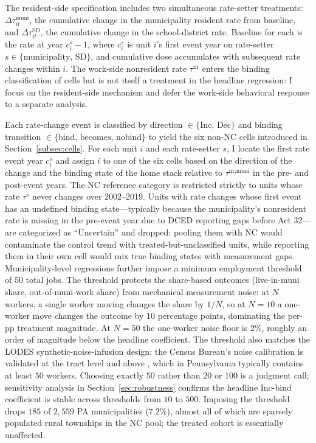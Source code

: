 \documentclass[12pt]{article}
\begin{document}
The resident-side specification includes two simultaneous rate-setter
treatments: $\Delta\tau^{\text{muni}}_{it}$, the cumulative change in
the municipality resident rate from baseline, and $\Delta\tau^{\text{SD}}_{it}$,
the cumulative change in the school-district rate. Baseline for each
is the rate at year $c_i^s - 1$, where $c_i^s$ is unit $i$'s first
event year on rate-setter $s \in \{\text{municipality, SD}\}$, and cumulative dose
accumulates with subsequent rate changes within $i$. The work-side
nonresident rate $\tau^{\text{nr}}$ enters the binding
classification of cells but is not itself a treatment in the headline
regression: I focus on the resident-side mechanism and defer the
work-side behavioral response to a separate analysis.

Each rate-change event is classified by direction
$\in \{\text{Inc, Dec}\}$ and binding transition
$\in \{\text{bind, becomes, nobind}\}$ to yield the six non-NC cells
introduced in Section~\ref{subsec:cells}. For each unit $i$ and each
rate-setter $s$, I locate the first rate event year $c^s_i$ and
assign $i$ to one of the six cells based on the direction of the
change and the binding state of the home stack relative to
$\tau^{\text{nr,muni}}$ in the pre- and post-event years. The NC
reference category is restricted strictly to units whose rate
$\tau^s$ never changes over 2002--2019. Units with rate changes
whose first event has an undefined binding state---typically because
the municipality's nonresident rate is missing in the pre-event year due to
DCED reporting gaps before Act 32---are categorized as ``Uncertain''
and dropped: pooling them with NC would contaminate the control trend
with treated-but-unclassified units, while reporting them in their
own cell would mix true binding states with measurement gaps.
Municipality-level regressions further impose a minimum employment
threshold of $50$ total jobs. The threshold protects the share-based
outcomes (live-in-muni share, out-of-muni-work share)
from mechanical measurement noise: at $N$ workers, a single worker
moving changes the share by $1/N$, so at $N=10$ a one-worker move
changes the outcome by 10 percentage points, dominating the per-pp
treatment magnitude. At $N=50$ the one-worker noise floor is $2\%$,
roughly an order of magnitude below the headline coefficient. The
threshold also matches the LODES synthetic-noise-infusion design:
the Census Bureau's noise calibration is validated at the tract
level and above \citep{grahamDESIGNCOMPARISONLODES}, which in
Pennsylvania typically contains at least $50$ workers. Choosing
exactly $50$ rather than $20$ or $100$ is a judgment call;
sensitivity analysis in Section~\ref{sec:robustness} confirms the
headline Inc-bind coefficient is stable across thresholds from $10$
to $500$. Imposing the threshold drops $185$ of $2{,}559$ PA municipalities
($7.2\%$), almost all of which are sparsely populated rural
townships in the NC pool; the treated cohort is essentially
unaffected.
\end{document}
